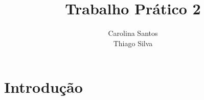 \documentclass[11pt]{article}
\title{\textbf{Trabalho Prático 2}}
\author{Carolina Santos\\
		Thiago Silva}
\date{}
\begin{document}
\maketitle

\section{Introdução}
\end{document}
